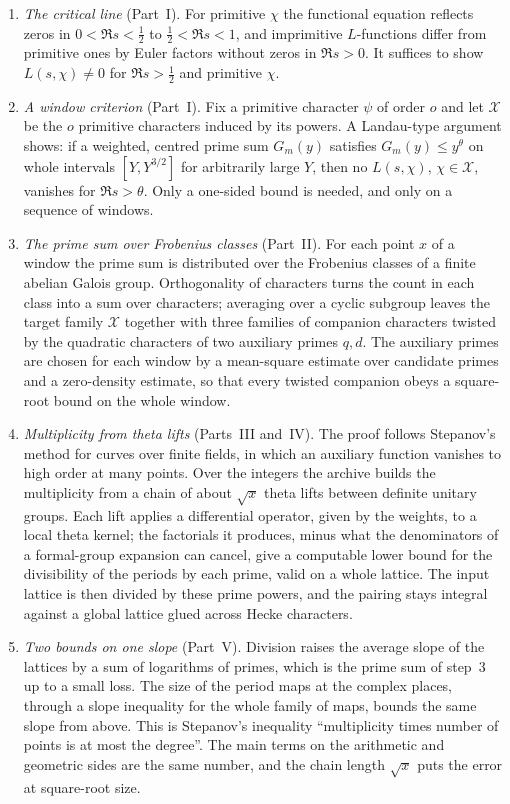\begin{enumerate}
\item \emph{The critical line} (Part~I). For primitive $\chi$ the functional equation reflects zeros in $0<\Re s<\tfrac12$ to $\tfrac12<\Re s<1$, and imprimitive $L$-functions differ from primitive ones by Euler factors without zeros in $\Re s>0$. It suffices to show $L(s,\chi)\ne0$ for $\Re s>\tfrac12$ and primitive $\chi$.
\item \emph{A window criterion} (Part~I). Fix a primitive character $\psi$ of order $o$ and let $\mathcal X$ be the $o$ primitive characters induced by its powers. A Landau-type argument shows: if a weighted, centred prime sum $G_m(y)$ satisfies $G_m(y)\le y^{\theta}$ on whole intervals $[Y,Y^{3/2}]$ for arbitrarily large $Y$, then no $L(s,\chi)$, $\chi\in\mathcal X$, vanishes for $\Re s>\theta$. Only a one-sided bound is needed, and only on a sequence of windows.
\item \emph{The prime sum over Frobenius classes} (Part~II). For each point $x$ of a window the prime sum is distributed over the Frobenius classes of a finite abelian Galois group. Orthogonality of characters turns the count in each class into a sum over characters; averaging over a cyclic subgroup leaves the target family $\mathcal X$ together with three families of companion characters twisted by the quadratic characters of two auxiliary primes $q,d$. The auxiliary primes are chosen for each window by a mean-square estimate over candidate primes and a zero-density estimate, so that every twisted companion obeys a square-root bound on the whole window.
\item \emph{Multiplicity from theta lifts} (Parts~III and~IV). The proof follows Stepanov's method for curves over finite fields, in which an auxiliary function vanishes to high order at many points. Over the integers the archive builds the multiplicity from a chain of about $\sqrt x$ theta lifts between definite unitary groups. Each lift applies a differential operator, given by the weights, to a local theta kernel; the factorials it produces, minus what the denominators of a formal-group expansion can cancel, give a computable lower bound for the divisibility of the periods by each prime, valid on a whole lattice. The input lattice is then divided by these prime powers, and the pairing stays integral against a global lattice glued across Hecke characters.
\item \emph{Two bounds on one slope} (Part~V). Division raises the average slope of the lattices by a sum of logarithms of primes, which is the prime sum of step~3 up to a small loss. The size of the period maps at the complex places, through a slope inequality for the whole family of maps, bounds the same slope from above. This is Stepanov's inequality ``multiplicity times number of points is at most the degree''. The main terms on the arithmetic and geometric sides are the same number, and the chain length $\sqrt x$ puts the error at square-root size.

\end{enumerate}
